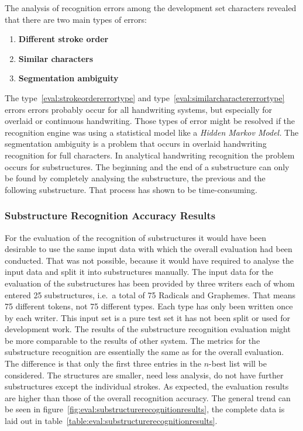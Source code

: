 The analysis of recognition errors among the development set characters 
revealed that there are two main types of errors: 
\begin{enumerate}
\item \textbf{Different stroke order}\label{eval:strokeordererrortype}
\item \textbf{Similar characters}    \label{eval:similarcharactererrortype}
\item \textbf{Segmentation ambiguity}\label{eval:segmentationambiguityerrortype}
\end{enumerate}
The type~\ref{eval:strokeordererrortype} and 
type~\ref{eval:similarcharactererrortype} errors errors probably occur for
all handwriting systems, but especially for overlaid or continuous handwriting.
Those types of error might be resolved if the recognition engine
was using a statistical model like a \emph{Hidden Markov Model.}
The segmentation ambiguity is a problem that occurs in overlaid handwriting
recognition for full characters. In analytical handwriting recognition
the problem occurs for substructures. The beginning and the end
of a substructure can only be found by completely analysing the substructure,
the previous and the following substructure. That process has
shown to be time-consuming.

\subsubsection{Substructure Recognition Accuracy Results}
\label{sec:eval:resultssubstructurerecognition}
For the evaluation of the recognition of substructures it would have been
desirable to use the same input data with which the overall evaluation
had been conducted. That was not possible, because it would have required
to analyse the input data and split it into substructures manually.
The input data for the evaluation of the substructures has been provided by
three writers each of whom entered 25 substructures, i.e.\ a total of 75
Radicals and Graphemes. That means 75 different tokens, not 75 different types.
Each type has only been written once by each writer.
This input set is a pure test set it has not been split or used for
development work. The results of the substructure recognition evaluation
might be more comparable to the results of other system.
The metrics for the substructure recognition are essentially the same as for
the overall evaluation.
The difference is that only the first three entries in the \(n\)-best list
will be considered. The structures are smaller, need less analysis, do not
have further substructures except the individual strokes. 
As expected, the evaluation results are higher than those of the overall 
recognition accuracy. The general trend can be seen in 
figure~\ref{fig:eval:substructurerecognitionresults}, the complete data is
laid out in table~\ref{table:eval:substructurerecognitionresults}.

